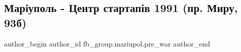  
 
 
 
 

\subsection{Маріуполь - Центр стартапів 1991 (пр. Миру, 93б)}
\label{sec:19_01_2023.fb.fb_group.mariupol.pre_war.1.mar_upol___tsentr_st}

\ifcmt
 author_begin
   author_id fb_group.mariupol.pre_war
 author_end
\fi
